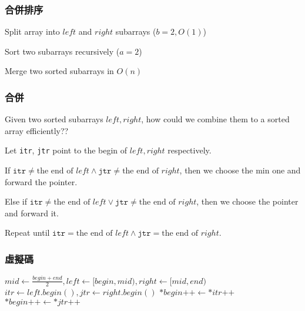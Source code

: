 \documentclass{beamer}
\begin{document}
\frame
{
	\frametitle{合併排序}
	
	\begin{description}
		\item<1->[Divide]Split array into $left$ and $right$ subarrays ($b = 2, O(1)$)
		\item<2->[Conquer]Sort two subarrays recursively ($a = 2$)
		\item<3->[Combine]Merge two sorted subarrays in $O(n)$
	\end{description}
}

\frame
{
	\frametitle{合併}
	
	Given two sorted subarrays $left, right$, how could we combine them to a sorted array efficiently??\pause
	
	Let \texttt{itr}, \texttt{jtr} point to the begin of $left, right$ respectively.\pause
	
	If $\texttt{itr} \neq \text{the end of }left \land \texttt{jtr} \neq \text{the end of }right$, then we choose the min one and forward the pointer.\pause
	
	Else if $\texttt{itr} \neq \text{the end of }left \lor \texttt{jtr} \neq \text{the end of }right$, then we choose the pointer and forward it.\pause
	
	Repeat until $\texttt{itr} = \text{the end of }left \land \texttt{jtr} = \text{the end of }right$.
}

\frame
{
	\frametitle{虛擬碼}
	
	\begin{algorithmic}
			\pause
				\State\Return
			\EndIf
			\pause
            \State$mid\gets\frac{begin+end}{2}, left\gets[begin, mid), right\gets[mid, end)$
            \pause
            \State{}
            \State{} 
            \pause
            \State$itr\gets left.begin(), jtr\gets right.begin()$
					\State$*begin\texttt{++}\gets*itr\texttt{++}$
				\Else
					\State$*begin\texttt{++}\gets*jtr\texttt{++}$
				\EndIf
            \EndWhile
        \EndProcedure
	\end{algorithmic}
}
\end{document}
